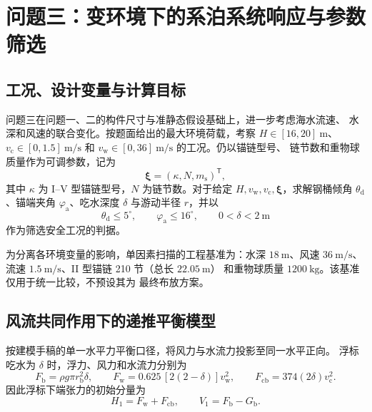 \section{问题三：变环境下的系泊系统响应与参数筛选}

\subsection{工况、设计变量与计算目标}

问题三在问题一、二的构件尺寸与准静态假设基础上，进一步考虑海水流速、
水深和风速的联合变化。按题面给出的最大环境荷载，考察
\(H\in[16,20]~\mathrm m\)、\(v_{\mathrm c}\in[0,1.5]~\mathrm{m/s}\)
和 \(v_{\mathrm w}\in[0,36]~\mathrm{m/s}\) 的工况。仍以锚链型号、
链节数和重物球质量作为可调参数，记为
\begin{equation}
  \bm\xi=(\kappa,N,m_{\mathrm s})^{\mathsf T},
  \label{eq:q3-design-variable}
\end{equation}
其中 \(\kappa\) 为 I--V 型锚链型号，\(N\) 为链节数。对于给定
\(H,v_{\mathrm w},v_{\mathrm c},\bm\xi\)，求解钢桶倾角
\(\theta_{\mathrm d}\)、锚端夹角 \(\varphi_{\mathrm a}\)、吃水深度
\(\delta\) 与游动半径 \(r\)，并以
\begin{equation}
  \theta_{\mathrm d}\leq 5^\circ,
  \qquad \varphi_{\mathrm a}\leq 16^\circ,
  \qquad 0<\delta<2~\mathrm m
  \label{eq:q3-safety-constraints}
\end{equation}
作为筛选安全工况的判据。

为分离各环境变量的影响，单因素扫描的工程基准为：水深
\(18~\mathrm m\)、风速 \(36~\mathrm{m/s}\)、流速
\(1.5~\mathrm{m/s}\)、II 型锚链 210 节（总长 \(22.05~\mathrm m\)）
和重物球质量 \(1200~\mathrm{kg}\)。该基准仅用于统一比较，不预设其为
最终布放方案。

\subsection{风流共同作用下的递推平衡模型}

按建模手稿的单一水平力平衡口径，将风力与水流力投影至同一水平正向。
浮标吃水为 \(\delta\) 时，浮力、风力和水流力分别为
\begin{equation}
  F_{\mathrm b}=\rho g\pi r_{\mathrm b}^2\delta,
  \qquad
  F_{\mathrm w}=0.625\,[2(2-\delta)]v_{\mathrm w}^2,
  \qquad
  F_{\mathrm{cb}}=374(2\delta)v_{\mathrm c}^2.
  \label{eq:q3-buoy-loads}
\end{equation}
因此浮标下端张力的初始分量为
\begin{equation}
  H_1=F_{\mathrm w}+F_{\mathrm{cb}},
  \qquad
  V_1=F_{\mathrm b}-G_{\mathrm b}.
  \label{eq:q3-buoy-tension}
\end{equation}

